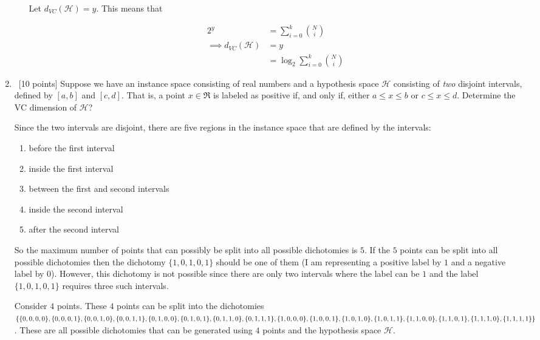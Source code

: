 \begin{enumerate}
\begin{enumerate}
Let $d_{VC}(\mathcal{H}) = y$. This means that

\begin{equation*}
\begin{aligned}
2^y &= \sum_{i=0}^k {N \choose i}\\
\implies d_{VC}(\mathcal{H}) &= y\\
 &= \log_2 \sum_{i=0}^k {N \choose i}
\end{aligned}
\end{equation*}

  \end{enumerate}

\item ~[10 points] Suppose we have an instance space consisting of
  real numbers and a hypothesis space $\mathcal{H}$ consisting of {\em
    two} disjoint intervals, defined by $[a, b]$ and $[c, d]$. That
  is, a point $x \in \Re$ is labeled as positive if, and only if,
  either $a \leq x \leq b$ or $c \leq x \leq d$. Determine the VC
  dimension of $\mathcal{H}$?

Since the two intervals are disjoint, there are five regions in the instance space that are defined by the intervals:

\begin{enumerate}
\item before the first interval
\item inside the first interval
\item between the first and second intervals
\item inside the second interval
\item after the second interval
\end{enumerate}

So the maximum number of points that can possibly be split into all possible dichotomies is $5$. If the $5$ points can be split into all possible dichotomies then the dichotomy $\{1,0,1,0,1\}$ should be one of them (I am representing a positive label by $1$ and a negative label by $0$). However, this dichotomy is not possible since there are only two intervals where the label can be $1$ and the label $\{1,0,1,0,1\}$ requires three such intervals.

Consider $4$ points. These $4$ points can be split into the dichotomies $\{\{0,0,0,0\},\{0,0,0,1\},\\\{0,0,1,0\},\{0,0,1,1\},\{0,1,0,0\},\{0,1,0,1\},\{0,1,1,0\},\{0,1,1,1\},\{1,0,0,0\},\{1,0,0,1\},\\\{1,0,1,0\},\{1,0,1,1\},\{1,1,0,0\},\{1,1,0,1\},\{1,1,1,0\},\{1,1,1,1\}\}$. These are all possible dichotomies that can be generated using $4$ points and the hypothesis space $\mathcal{H}$.\\ 


\end{enumerate}
